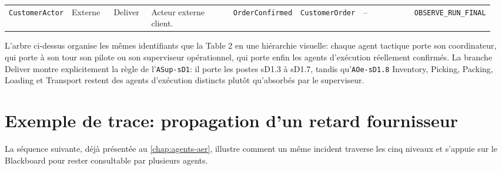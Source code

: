 \begin{landscape}
{\begin{longtable}{L{0.11\linewidth} L{0.09\linewidth} L{0.08\linewidth} L{0.20\linewidth} L{0.13\linewidth} L{0.13\linewidth} L{0.13\linewidth} L{0.09\linewidth}}
\texttt{Customer\allowbreak Actor} & Externe & Deliver & Acteur externe client. & \texttt{Order\allowbreak Confirmed} & \texttt{Customer\allowbreak Order} & -- & \texttt{OBSERVE\_\allowbreak RUN\_\allowbreak FINAL} \\
\end{longtable}
}
\end{landscape}


L'arbre ci-dessus organise les mêmes identifiants que la Table 2 en une hiérarchie visuelle: chaque agent tactique porte son coordinateur, qui porte à son tour son pilote ou son superviseur opérationnel, qui porte enfin les agents d'exécution réellement confirmés. La branche Deliver montre explicitement la règle de l'\texttt{ASup-s\allowbreak D1}: il porte les postes sD1.3 à sD1.7, tandis qu'\texttt{AOe-s\allowbreak D1.8} Inventory, Picking, Packing, Loading et Transport restent des agents d'exécution distincts plutôt qu'absorbés par le superviseur.


\section{Exemple de trace: propagation d'un retard fournisseur}

La séquence suivante, déjà présentée au \cref{chap:agents-aer}, illustre comment un même incident traverse les cinq niveaux et s'appuie sur le Blackboard pour rester consultable par plusieurs agents.

